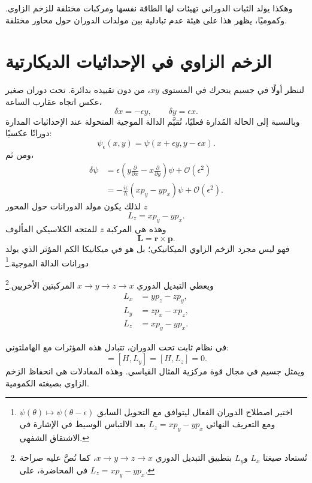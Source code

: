 وهكذا يولد الثبات الدوراني تهيئات لها الطاقة نفسها ومركبات مختلفة للزخم الزاوي. وكموميًا، يظهر هذا على هيئة عدم تبادلية بين مولدات الدوران حول محاور مختلفة.

\section{الزخم الزاوي في الإحداثيات الديكارتية}

لننظر أولًا في جسيم يتحرك في المستوى \(xy\)، من دون تقييده بدائرة. تحت دوران صغير عكس اتجاه عقارب الساعة،
\begin{equation}
\delta x=-\epsilon y,
\qquad
\delta y=\epsilon x.
\end{equation}
وبالنسبة إلى الحالة المُدارة فعليًا، تُقيَّم الدالة الموجية المتحولة عند الإحداثيات المدارة دورانًا عكسيًا:
\begin{equation}
\psi_\epsilon(x,y)
=\psi(x+\epsilon y,y-\epsilon x).
\end{equation}
ومن ثم،
\begin{align}
\delta\psi
&=\epsilon\left(
y\frac{\partial}{\partial x}
-x\frac{\partial}{\partial y}
\right)\psi
+\mathcal O(\epsilon^2)\\
&=-\frac{i\epsilon}{\hbar}
\left(xp_y-yp_x\right)\psi
+\mathcal O(\epsilon^2).
\end{align}
لذلك يكون مولد الدورانات حول المحور \(z\)
\begin{equation}
L_z=xp_y-yp_x.
\end{equation}
وهذه هي المركبة \(z\) للمتجه الكلاسيكي المألوف
\begin{equation}
\mathbf L=\mathbf r\times\mathbf p.
\end{equation}
فهو ليس مجرد الزخم الزاوي الميكانيكي؛ بل هو في ميكانيكا الكم المؤثر الذي يولد دورانات الدالة الموجية.\footnote{اختير اصطلاح الدوران الفعال ليتوافق مع التحويل السابق \(\psi(\theta)\mapsto\psi(\theta-\epsilon)\) ومع التعريف النهائي \(L_z=xp_y-yp_x\) بعد الالتباس الوسيط في الإشارة في الاشتقاق الشفهي.}

ويعطي التبديل الدوري \(x\to y\to z\to x\) المركبتين الأخريين.\footnote{تُستعاد صيغتا \(L_x\) و\(L_y\) بتطبيق التبديل الدوري \(x\to y\to z\to x\)، كما نُصَّ عليه صراحة في المحاضرة، على \(L_z=xp_y-yp_x\).}
\begin{align}
L_x&=yp_z-zp_y,\\
L_y&=zp_x-xp_z,\\
L_z&=xp_y-yp_x.
\end{align}

في نظام ثابت تحت الدوران، تتبادل هذه المؤثرات مع الهاملتوني:
\begin{equation}
[H,L_x]=[H,L_y]=[H,L_z]=0.
\end{equation}
ويمثل جسيم في مجال قوة مركزية المثال القياسي. وهذه المعادلات هي انحفاظ الزخم الزاوي بصيغته الكمومية.


